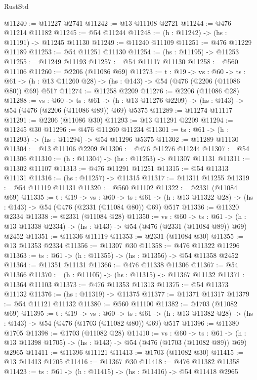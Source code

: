 \begin{lexlean}{RustStd}
\begin{coremodule}
@11240 := @11227 @2741
@11242 := @13 @11108 @2721
@11244 := @476 @11214 @11182
@11245 := @54 @11244
@11248 := (h : @11242) -> (hs : @11191) -> @11245 @11130
@11249 := @11240 @11109
@11251 := @476 @11229 @11189
@11253 := @54 @11251 @11130
@11254 := (hs : @11195) -> @11253
@11255 := @11249 @11193
@11257 := @54 @11117 @11130
@11258 := @560 @11106
@11260 := @2206 (@11086 @69)
@11273 := {t : @19} ->
  {vs : @60} ->
  {ts : @61} -> (h : @13 @11260 @28) -> (hs : @143) -> @54 (@476 (@2206 (@11086 @80)) @69) @517
@11274 := @11258 @2209
@11276 := @2206 (@11086 @28)
@11288 := {vs : @60} ->
  {ts : @61} -> (h : @13 @11276 @2209) -> (hs : @143) -> @54 (@476 (@2206 (@11086 @89)) @69) @5375
@11289 := @11274 @11117
@11291 := @2206 (@11086 @30)
@11293 := @13 @11291 @2209
@11294 := @11245 @30
@11296 := @476 @11260 @11234
@11301 := {ts : @61} -> (h : @11293) -> (hs : @11294) -> @54 @11296 @5375
@11302 := @11289 @11130
@11304 := @13 @11106 @2209
@11306 := @476 @11276 @11244
@11307 := @54 @11306
@11310 := (h : @11304) -> (hs : @11253) -> @11307 @11131
@11311 := @11302 @11107
@11313 := @476 @11291 @11251
@11315 := @54 @11313 @11131
@11316 := (hs : @11257) -> @11315
@11317 := @11311 @11255
@11319 := @54 @11119 @11131
@11320 := @560 @11102
@11322 := @2331 (@11084 @69)
@11335 := {t : @19} ->
  {vs : @60} ->
  {ts : @61} -> (h : @13 @11322 @28) -> (hs : @143) -> @54 (@476 (@2331 (@11084 @80)) @69) @517
@11336 := @11320 @2334
@11338 := @2331 (@11084 @28)
@11350 := {vs : @60} ->
  {ts : @61} -> (h : @13 @11338 @2334) -> (hs : @143) -> @54 (@476 (@2331 (@11084 @89)) @69) @2452
@11351 := @11336 @11119
@11353 := @2331 (@11084 @30)
@11355 := @13 @11353 @2334
@11356 := @11307 @30
@11358 := @476 @11322 @11296
@11363 := {ts : @61} -> (h : @11355) -> (hs : @11356) -> @54 @11358 @2452
@11364 := @11351 @11131
@11366 := @476 @11338 @11306
@11367 := @54 @11366
@11370 := (h : @11105) -> (hs : @11315) -> @11367 @11132
@11371 := @11364 @11103
@11373 := @476 @11353 @11313
@11375 := @54 @11373 @11132
@11376 := (hs : @11319) -> @11375
@11377 := @11371 @11317
@11379 := @54 @11121 @11132
@11380 := @560 @11100
@11382 := @1703 (@11082 @69)
@11395 := {t : @19} ->
  {vs : @60} ->
  {ts : @61} -> (h : @13 @11382 @28) -> (hs : @143) -> @54 (@476 (@1703 (@11082 @80)) @69) @517
@11396 := @11380 @1705
@11398 := @1703 (@11082 @28)
@11410 := {vs : @60} ->
  {ts : @61} -> (h : @13 @11398 @1705) -> (hs : @143) -> @54 (@476 (@1703 (@11082 @89)) @69) @2965
@11411 := @11396 @11121
@11413 := @1703 (@11082 @30)
@11415 := @13 @11413 @1705
@11416 := @11367 @30
@11418 := @476 @11382 @11358
@11423 := {ts : @61} -> (h : @11415) -> (hs : @11416) -> @54 @11418 @2965

\end{coremodule}
\end{lexlean}
